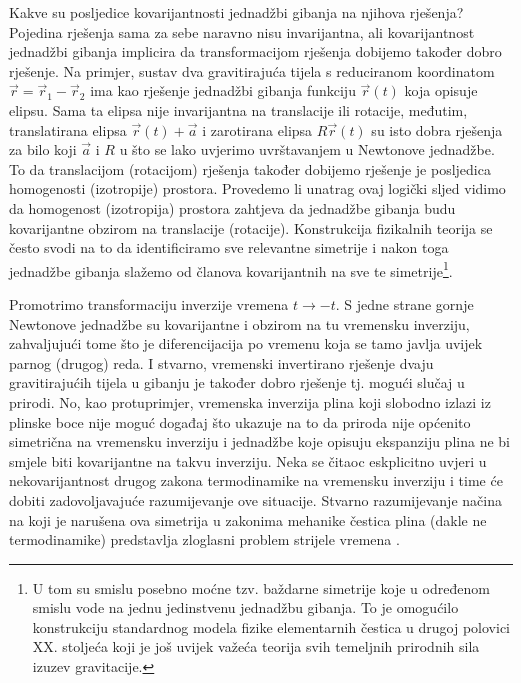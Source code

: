 Kakve su posljedice kovarijantnosti jednadžbi gibanja na njihova
rješenja?
Pojedina rješenja sama za sebe naravno nisu invarijantna, ali 
kovarijantnost jednadžbi gibanja implicira da transformacijom rješenja
dobijemo također dobro rješenje.
Na primjer, sustav dva gravitirajuća tijela s reduciranom koordinatom $\vec{r}
= \vec{r}_1 - \vec{r}_2$ ima kao
rješenje jednadžbi gibanja funkciju $\vec{r}(t)$ koja opisuje elipsu.
Sama ta elipsa nije invarijantna na translacije ili rotacije,
međutim, translatirana elipsa $\vec{r}(t)+\vec{a}$ i zarotirana
elipsa $R\vec{r}(t)$ su isto dobra rješenja za bilo koji $\vec{a}$ i $R$
u što se lako uvjerimo uvrštavanjem u Newtonove jednadžbe.
To da translacijom (rotacijom) rješenja također dobijemo rješenje je posljedica
homogenosti (izotropije) prostora.
Provedemo li unatrag ovaj logički sljed vidimo da homogenost
(izotropija) prostora zahtjeva da jednadžbe gibanja budu kovarijantne
obzirom na translacije (rotacije). Konstrukcija fizikalnih teorija se
često svodi na to da identificiramo sve relevantne simetrije i nakon toga
jednadžbe gibanja slažemo od članova kovarijantnih na sve te simetrije\footnote{%
    U tom su smislu posebno moćne tzv. baždarne simetrije koje u
    određenom smislu vode na jednu jedinstvenu jednadžbu gibanja.
To je omogućilo konstrukciju standardnog modela fizike elementarnih čestica
u drugoj polovici XX. stoljeća koji je još uvijek važeća
teorija svih temeljnih prirodnih sila izuzev gravitacije.}.


\begin{primjer}
Promotrimo transformaciju inverzije vremena $t \to -t$.
S jedne strane gornje Newtonove jednadžbe su kovarijantne i obzirom na tu vremensku
inverziju, zahvaljujući tome što je diferencijacija po vremenu koja
se tamo javlja uvijek parnog (drugog) reda. 
I stvarno, vremenski invertirano rješenje dvaju gravitirajućih
tijela u gibanju je također dobro rješenje tj. mogući slučaj u prirodi.
No, kao protuprimjer, vremenska inverzija plina koji slobodno izlazi iz plinske boce nije
moguć događaj što ukazuje na to da priroda nije općenito simetrična na vremensku inverziju i
jednadžbe koje opisuju ekspanziju plina ne bi smjele biti kovarijantne
na takvu inverziju. Neka se čitaoc eskplicitno uvjeri u nekovarijantnost drugog
zakona termodinamike na vremensku inverziju i time će dobiti zadovoljavajuće
razumijevanje ove situacije. Stvarno razumijevanje načina na koji je narušena
ova simetrija u zakonima mehanike čestica plina (dakle ne termodinamike) 
predstavlja zloglasni problem strijele vremena \cite{Zeh:2007}.

\end{primjer}

